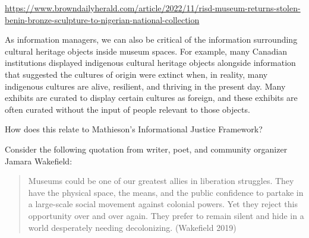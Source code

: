 \documentclass[
  letterpaper,
  DIV=11,
  numbers=noendperiod]{scrreprt}
\begin{document}
\begin{tcolorbox}[enhanced jigsaw, arc=.35mm, bottomrule=.15mm, bottomtitle=1mm, breakable, colback=white, colbacktitle=quarto-callout-note-color!10!white, colframe=quarto-callout-note-color-frame, coltitle=black, left=2mm, leftrule=.75mm, opacityback=0, opacitybacktitle=0.6, rightrule=.15mm, title=\textcolor{quarto-callout-note-color}{\faInfo}\hspace{0.5em}{In the news}, titlerule=0mm, toprule=.15mm, toptitle=1mm]

\url{https://www.browndailyherald.com/article/2022/11/risd-museum-returns-stolen-benin-bronze-sculpture-to-nigerian-national-collection}

\end{tcolorbox}

As information managers, we can also be critical of the information
surrounding cultural heritage objects inside museum spaces. For example,
many Canadian institutions displayed indigenous cultural heritage
objects alongside information that suggested the cultures of origin were
extinct when, in reality, many indigenous cultures are alive, resilient,
and thriving in the present day. Many exhibits are curated to display
certain cultures as foreign, and these exhibits are often curated
without the input of people relevant to those objects.

\begin{tcolorbox}[enhanced jigsaw, arc=.35mm, bottomrule=.15mm, bottomtitle=1mm, breakable, colback=white, colbacktitle=quarto-callout-tip-color!10!white, colframe=quarto-callout-tip-color-frame, coltitle=black, left=2mm, leftrule=.75mm, opacityback=0, opacitybacktitle=0.6, rightrule=.15mm, title=\textcolor{quarto-callout-tip-color}{\faLightbulb}\hspace{0.5em}{Pause and reflect}, titlerule=0mm, toprule=.15mm, toptitle=1mm]

How does this relate to Mathieson's Informational Justice Framework?

\end{tcolorbox}

Consider the following quotation from writer, poet, and community
organizer Jamara Wakefield:

\begin{quote}
Museums could be one of our greatest allies in liberation struggles.
They have the physical space, the means, and the public confidence to
partake in a large-scale social movement against colonial powers. Yet
they reject this opportunity over and over again. They prefer to remain
silent and hide in a world desperately needing decolonizing. (Wakefield
2019)
\end{quote}
\end{document}
